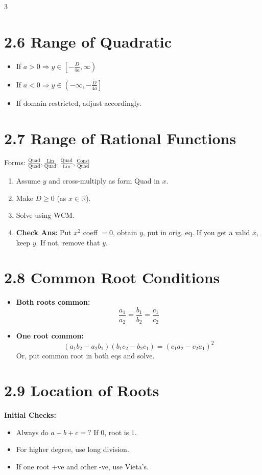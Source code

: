 \documentclass[11pt,a4paper,landscape]{article}
\begin{document}
\begin{multicols*}{3}
\section*{2.6 Range of Quadratic}
\begin{itemize}
\item If $a>0 \Rightarrow y \in \left[-\frac{D}{4a}, \infty\right)$
\item If $a<0 \Rightarrow y \in \left(-\infty, -\frac{D}{4a}\right]$
\item If domain restricted, adjust accordingly.
\end{itemize}

\section*{2.7 Range of Rational Functions}
Forms: $\frac{\text{Quad}}{\text{Quad}}, \frac{\text{Lin}}{\text{Quad}}, \frac{\text{Quad}}{\text{Lin}}, \frac{\text{Const}}{\text{Quad}}$
\begin{enumerate}
\item Assume $y$ and cross-multiply as form Quad in $x$.
\item Make $D \ge 0$ (as $x \in \mathbb{R}$).
\item Solve using WCM.
\item \textbf{Check Ans:} Put $x^2$ coeff $= 0$, obtain $y$, put in orig. eq. If you get a valid $x$, keep $y$. If not, remove that $y$.
\end{enumerate}

\section*{2.8 Common Root Conditions}
\begin{itemize}
\item \textbf{Both roots common:}
$$\frac{a_1}{a_2} = \frac{b_1}{b_2} = \frac{c_1}{c_2}$$
\item \textbf{One root common:}
$$(a_1b_2 - a_2b_1)(b_1c_2 - b_2c_1) = (c_1a_2 - c_2a_1)^2$$
Or, put common root in both eqs and solve.
\end{itemize}

\section*{2.9 Location of Roots}
\textbf{Initial Checks:}
\begin{itemize}
\item Always do $a+b+c = ?$ If $0$, root is $1$.
\item For higher degree, use long division.
\item If one root +ve and other -ve, use Vieta's.
\end{itemize}


\end{multicols*}
\end{document}
